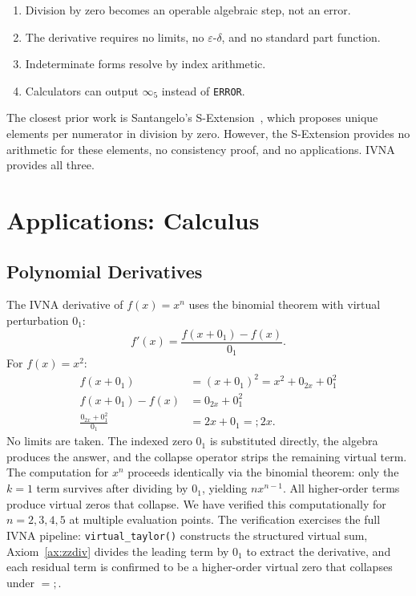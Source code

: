 \documentclass[12pt]{article}
\theoremstyle{definition}
\theoremstyle{remark}
\newcommand{\vz}[1]{0_{#1}}             %
\newcommand{\vi}[1]{\infty_{#1}}        %
\newcommand{\vzn}[2]{0^{#1}_{#2}}       %
\newcommand{\ceq}{\mathrel{=\!\!;}}     %
\begin{document}
\begin{enumerate}
\item Division by zero becomes an operable algebraic step, not an error.
\item The derivative requires no limits, no $\varepsilon$-$\delta$,
  and no standard part function.
\item Indeterminate forms resolve by index arithmetic.
\item Calculators can output $\vi{5}$ instead of \texttt{ERROR}.
\end{enumerate}

The closest prior work is Santangelo's S-Extension~\cite{santangelo2016},
which proposes unique elements per numerator in division by zero.
However, the S-Extension provides no arithmetic for these elements,
no consistency proof, and no applications. IVNA provides all three.


\section{Applications: Calculus}
\label{sec:calculus}

\subsection{Polynomial Derivatives}

The IVNA derivative of $f(x) = x^n$ uses the binomial theorem with
virtual perturbation $\vz{1}$:
\[
f'(x) = \frac{f(x + \vz{1}) - f(x)}{\vz{1}}.
\]
For $f(x) = x^2$:
\begin{align*}
f(x + \vz{1}) &= (x + \vz{1})^2 = x^2 + \vz{2x} + \vzn{2}{1} \\
f(x + \vz{1}) - f(x) &= \vz{2x} + \vzn{2}{1} \\
\frac{\vz{2x} + \vzn{2}{1}}{\vz{1}} &= 2x + \vz{1} \ceq 2x.
\end{align*}
No limits are taken. The indexed zero $\vz{1}$ is substituted directly,
the algebra produces the answer, and the collapse operator strips the
remaining virtual term. The computation for $x^n$ proceeds identically
via the binomial theorem: only the $k=1$ term survives after dividing
by $\vz{1}$, yielding $nx^{n-1}$. All higher-order terms produce
virtual zeros that collapse. We have verified this computationally
for $n = 2, 3, 4, 5$ at multiple evaluation points. The verification
exercises the full IVNA pipeline: \texttt{virtual\_taylor()} constructs
the structured virtual sum, Axiom~\ref{ax:zzdiv} divides the leading
term by $\vz{1}$ to extract the derivative, and each residual term is
confirmed to be a higher-order virtual zero that collapses under $\ceq$.
\end{document}
